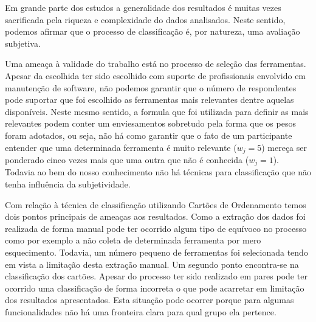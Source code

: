 Em grande parte dos estudos a generalidade dos resultados é muitas vezes
sacrificada pela riqueza e complexidade do dados analisados. Neste sentido,
podemos afirmar que o processo de classificação é, por natureza, uma avaliação
subjetiva.

Uma ameaça à validade do trabalho está no processo de seleção das ferramentas.
Apesar da escolhida ter sido escolhido com suporte de profissionais envolvido em
manutenção de software, não podemos garantir que o número de respondentes pode
suportar que foi escolhido as ferramentas mais relevantes dentre aquelas
disponíveis. Neste mesmo sentido, a formula que foi utilizada para definir as
mais relevantes podem conter um enviesamentos sobretudo pela forma que os pesos
foram adotados, ou seja, não há como garantir que o fato de um participante
entender que uma determinada ferramenta é muito relevante ($w_j = 5$) mereça ser
ponderado cinco vezes mais que uma outra que não é conhecida ($w_j = 1$).
Todavia ao bem do nosso conhecimento não há técnicas para classificação que não
tenha influência da subjetividade.

Com relação à técnica de classificação utilizando Cartões de Ordenamento temos
dois pontos principais de ameaças aos resultados. Como a extração dos dados foi
realizada de forma manual pode ter ocorrido algum tipo de equívoco no processo
como por exemplo a  não coleta de determinada ferramenta por mero esquecimento.
Todavia, um número pequeno de ferramentas foi selecionada tendo em vista a
limitação desta extração manual. Um segundo ponto encontra-se na classificação
dos cartões. Apesar do processo ter sido realizado em pares pode ter ocorrido
uma classificação de forma incorreta o que pode acarretar em limitação dos
resultados apresentados. Esta situação pode ocorrer porque para algumas
funcionalidades não há uma fronteira clara para qual grupo ela pertence.

